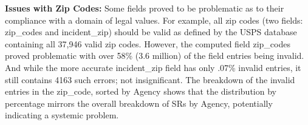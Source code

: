 \documentclass[12pt, titlepage]{article}
\begin{document}

\label{sec:zipcodesissues}
 \textbf{Issues with Zip Codes:} Some fields proved to be problematic 
 as to their compliance with a domain of legal values. For example, all zip codes 
 (two fields: zip\_codes and incident\_zip) should be valid as defined 
 by the USPS database containing all 37,946 valid zip codes. However,
 the computed field zip\_codes proved problematic with over 
58\% (3.6 million) of the field entries being invalid. And while the more accurate 
incident\_zip field has only .07\% invalid entries, it still contains
4163 such errors; not insignificant. The breakdown of the invalid 
entries in the zip\_code, sorted by Agency shows that the 
distribution by percentage mirrors the overall breakdown of 
SRs by Agency, potentially indicating a systemic problem.
	
\end{document}
